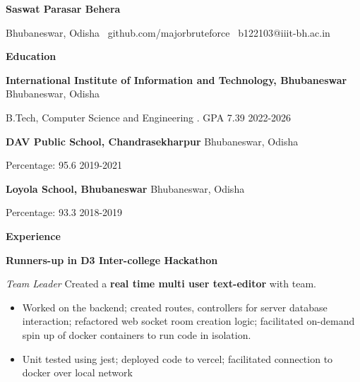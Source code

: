 \documentclass[11pt]{article}
\begin{document}
\begin{center}
    \textbf{Saswat Parasar Behera}\\ 
    \hrulefill
\end{center}

\begin{center}
   Bhubaneswar, Odisha \textbullet \ github.com/majorbruteforce \textbullet \ b122103@iiit-bh.ac.in
\end{center}

\vspace{0.5pt}

\begin{center}
    \textbf{Education}
\end{center}
\textbf{International Institute of Information and Technology, Bhubaneswar} \hfill Bhubaneswar, Odisha

B.Tech, Computer Science and Engineering . GPA 7.39 \hfill 2022-2026 

\vspace{1pt}

\textbf{DAV Public School, Chandrasekharpur} \hfill	Bhubaneswar, Odisha

Percentage: 95.6 \hfill 2019-2021

\vspace{1pt}

\textbf{Loyola School, Bhubaneswar} \hfill	Bhubaneswar, Odisha

Percentage: 93.3 \hfill 2018-2019


\vspace{5pt}

\begin{center}
    \textbf{Experience}
\end{center}


\textbf{Runners-up in D3 Inter-college Hackathon}

\textit{Team Leader}
\vspace{5pt}
Created a \textbf{real time multi user text-editor} with team.
\begin{itemize}[noitemsep]
    \item Worked on the backend; created routes, controllers for server database interaction;
    refactored web socket room creation logic; facilitated on-demand spin up of docker containers to run code in isolation. 
    \item Unit tested using jest; deployed code to vercel; facilitated connection to docker over local network
\end{itemize}

\vspace{5pt}
\end{document}
